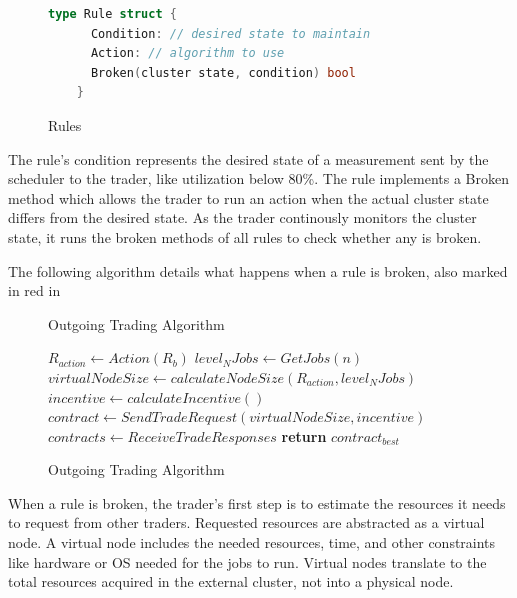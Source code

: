 \begin{figure}[H]
  \begin{lstlisting}[language=go]
    type Rule struct {
      Condition: // desired state to maintain
      Action: // algorithm to use
      Broken(cluster state, condition) bool
    } 
  \end{lstlisting}
  \caption{Rules}
\end{figure}

The rule's condition represents the desired state of a measurement sent by the
scheduler to the trader, like utilization below 80\%. The rule implements a
Broken method which allows the trader to run an action when the actual cluster
state differs from the desired state. As the trader continously monitors the
cluster state, it runs the broken methods of all rules to check whether any is
broken.

The following algorithm details what happens when a rule is broken, also marked
in red in  

\begin{figure}[H]
\begin{algorithm}[H]
\caption{Outgoing Trading Algorithm}
\begin{algorithmic}
   
    \State $R_{action} \gets Action(R_b)$
    \State $level_N Jobs \gets GetJobs(n)$ 
    \State $virtualNodeSize \gets calculateNodeSize(R_{action}, level_N Jobs)$
      \State $incentive \gets calculateIncentive()$
    \EndIf
      \State $contract \gets SendTradeRequest(virtualNodeSize, incentive)$
    \EndFor
    \State $contracts \gets ReceiveTradeResponses$ 
    \State \textbf{return} $contract_{best}$
  \EndProcedure
\end{algorithmic}
\end{algorithm}
\caption{Outgoing Trading Algorithm}
\end{figure}

When a rule is broken, the trader's first step is to estimate the resources it
needs to request from other traders. Requested resources are abstracted as a
virtual node. A virtual node includes the needed resources, time, and other
constraints like hardware or OS needed for the jobs to run. Virtual nodes 
translate to the total resources acquired in the external cluster, not into a
physical node. 

